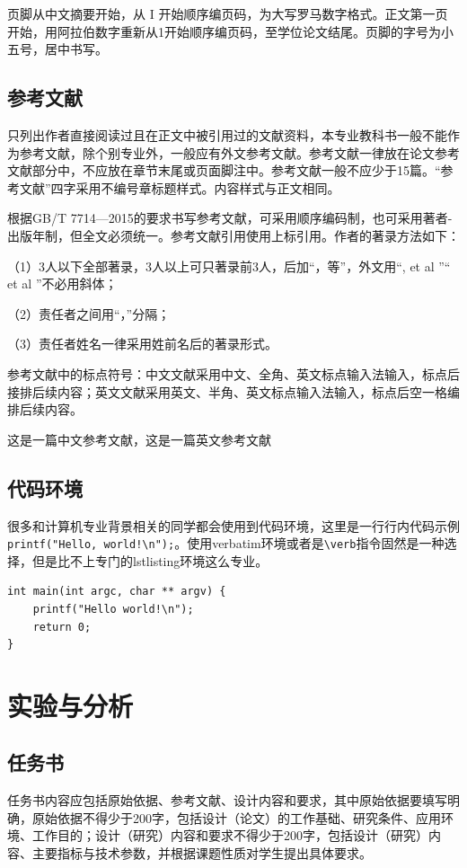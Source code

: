 页脚从中文摘要开始，从 I 开始顺序编页码，为大写罗马数字格式。正文第一页开始，用阿拉伯数字重新从1开始顺序编页码，至学位论文结尾。页脚的字号为小五号，居中书写。

\section{参考文献}

只列出作者直接阅读过且在正文中被引用过的文献资料，本专业教科书一般不能作为参考文献，除个别专业外，一般应有外文参考文献。参考文献一律放在论文参考文献部分中，不应放在章节末尾或页面脚注中。参考文献一般不应少于15篇。“参考文献”四字采用不编号章标题样式。内容样式与正文相同。

根据GB/T 7714—2015的要求书写参考文献，可采用顺序编码制，也可采用著者-出版年制，但全文必须统一。参考文献引用使用上标引用。作者的著录方法如下：

（1）3人以下全部著录，3人以上可只著录前3人，后加“，等”，外文用“, et al ”“ et al ”不必用斜体；

（2）责任者之间用“，”分隔；

（3）责任者姓名一律采用姓前名后的著录形式。

参考文献中的标点符号：中文文献采用中文、全角、英文标点输入法输入，标点后接排后续内容；英文文献采用英文、半角、英文标点输入法输入，标点后空一格编排后续内容。

这是一篇中文参考文献\cite{RJXB202110009,zhou2016MLbook}，这是一篇英文参考文献\cite{kiymik2005FT}

\section{代码环境}

很多和计算机专业背景相关的同学都会使用到代码环境，这里是一行行内代码示例\verb|printf("Hello, world!\n");|。使用verbatim环境或者是\verb|\verb|指令固然是一种选择，但是比不上专门的lstlisting环境这么专业。

\begin{lstlisting}
int main(int argc, char ** argv) {
    printf("Hello world!\n");
    return 0;
}
\end{lstlisting}


\chapter{实验与分析}

\section{任务书}
任务书内容应包括原始依据、参考文献、设计内容和要求，其中原始依据要填写明确，原始依据不得少于200字，包括设计（论文）的工作基础、研究条件、应用环境、工作目的；设计（研究）内容和要求不得少于200字，包括设计（研究）内容、主要指标与技术参数，并根据课题性质对学生提出具体要求。

